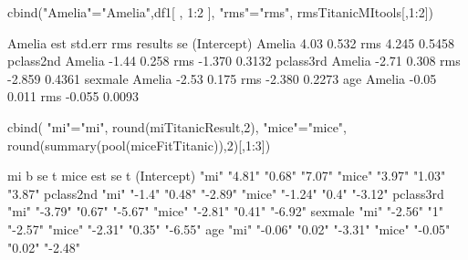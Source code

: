 \begin{Schunk}
\begin{Sinput}
 cbind("Amelia"="Amelia",df1[ , 1:2 ], "rms"="rms", rmsTitanicMItools[,1:2])
\end{Sinput}
\begin{Soutput}
            Amelia   est std.err rms results     se
(Intercept) Amelia  4.03   0.532 rms   4.245 0.5458
pclass2nd   Amelia -1.44   0.258 rms  -1.370 0.3132
pclass3rd   Amelia -2.71   0.308 rms  -2.859 0.4361
sexmale     Amelia -2.53   0.175 rms  -2.380 0.2273
age         Amelia -0.05   0.011 rms  -0.055 0.0093
\end{Soutput}
\begin{Sinput}
 cbind( "mi"="mi", round(miTitanicResult,2),  "mice"="mice", round(summary(pool(miceFitTitanic)),2)[,1:3])
\end{Sinput}
\begin{Soutput}
            mi   b       se     t       mice   est     se     t      
(Intercept) "mi" "4.81"  "0.68" "7.07"  "mice" "3.97"  "1.03" "3.87" 
pclass2nd   "mi" "-1.4"  "0.48" "-2.89" "mice" "-1.24" "0.4"  "-3.12"
pclass3rd   "mi" "-3.79" "0.67" "-5.67" "mice" "-2.81" "0.41" "-6.92"
sexmale     "mi" "-2.56" "1"    "-2.57" "mice" "-2.31" "0.35" "-6.55"
age         "mi" "-0.06" "0.02" "-3.31" "mice" "-0.05" "0.02" "-2.48"
\end{Soutput}
\end{Schunk}
